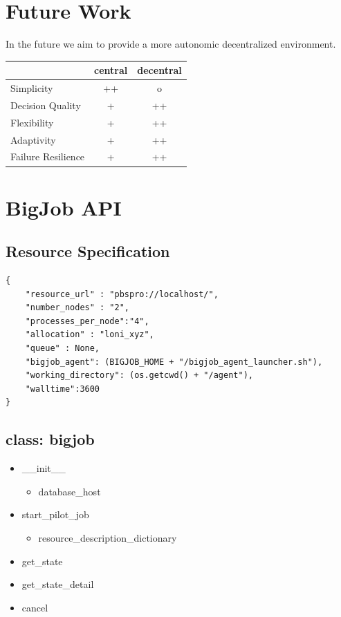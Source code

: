 \documentclass[]{article}
\begin{document}
\section{Future Work}

In the future we aim to provide a more autonomic decentralized environment.

\begin{tabular}{|l|c|c|}
	\hline
	&central &decentral\\
	\hline
Simplicity  &++			&o \\ \hline
Decision Quality &+ 	&++ \\ \hline
Flexibility &+			&++ \\ \hline
Adaptivity  &+ 			&++ \\ \hline
Failure Resilience &+   &++\\ \hline

\end{tabular}

\appendix
\section{BigJob API}
\label{sec:api}
\subsection{Resource Specification}


\begin{verbatim}
{
    "resource_url" : "pbspro://localhost/", 
    "number_nodes" : "2", 
    "processes_per_node":"4", 
    "allocation" : "loni_xyz", 
    "queue" : None, 
    "bigjob_agent": (BIGJOB_HOME + "/bigjob_agent_launcher.sh"), 
    "working_directory": (os.getcwd() + "/agent"), 
    "walltime":3600 
}
\end{verbatim}


\subsection{class: bigjob}


\begin{itemize}
	\item \_\_init\_\_
		\begin{itemize}
			\item database\_host
		\end{itemize}
	\item start\_pilot\_job
	\begin{itemize}
	   \item resource\_description\_dictionary
	\end{itemize}	
	\item get\_state	
	\item get\_state\_detail
	\item cancel
\end{itemize}
\end{document}

